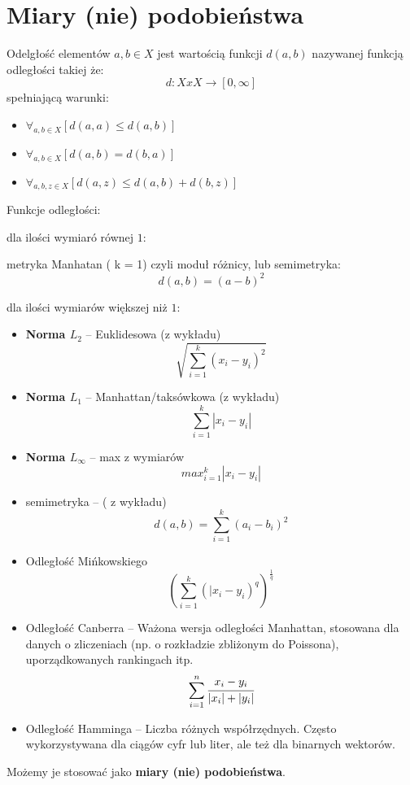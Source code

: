 \section{Miary (nie) podobieństwa}\label{sec:metryki}
Odelgłość elementów $a,b \in X$ jest wartością funkcji $d(a,b)$ nazywanej funkcją odległości takiej że:
$$
d:X x X \rightarrow [0,\infty]
$$
 spełniającą warunki:
 \begin{itemize}
     \item $\forall_{a,b \in X} [d(a,a) \le d(a,b)] $
     \item $\forall_{a,b \in X} [d(a,b) = d(b,a)] $
     \item $\forall_{a,b,z \in X} [d(a,z) \le d(a,b)+d(b,z)] $
 \end{itemize}

Funkcje odległości:

dla ilości wymiaró równej $1$:

metryka Manhatan ( k = 1) czyli moduł różnicy, lub semimetryka:
$$
d(a,b) = (a-b)^2
$$

dla ilości wymiarów większej niż $1$:
\begin{itemize}
    \item \textbf{Norma $L_2$} -- Euklidesowa (z wykładu) $$ \sqrt{\sum_{i=1}^k(x_i - y_i)^2} $$
    \item \textbf{Norma $L_1$} -- Manhattan/taksówkowa (z wykładu) $$ \sum_{i=1}^k|x_i - y_i|$$
    \item \textbf{Norma $L_{\infty}$} -- max z wymiarów $$ max_{i=1}^k |x_i-y_i| $$ 
    \item semimetryka -- ( z wykładu) $$ d(a,b) = \sum_{i=1}^k (a_i-b_i)^2$$
    \item Odległość Mińkowskiego $$ (\sum_{i=1}^k(|x_i-y_i)^q)^{\frac{1}{q}} $$
    \item Odległość Canberra -- Ważona wersja odległości Manhattan, stosowana dla danych o zliczeniach (np. o rozkładzie zbliżonym do Poissona), uporządkowanych rankingach itp. $$ \sum_{i=1}^n \cfrac{x_i-y_i}{|x_i|+|y_i|} $$
    \item Odległość Hamminga -- Liczba różnych współrzędnych. Często wykorzystywana dla ciągów cyfr lub liter, ale też dla binarnych wektorów. 
\end{itemize} 

Możemy je stosować jako \textbf{miary (nie) podobieństwa}. 